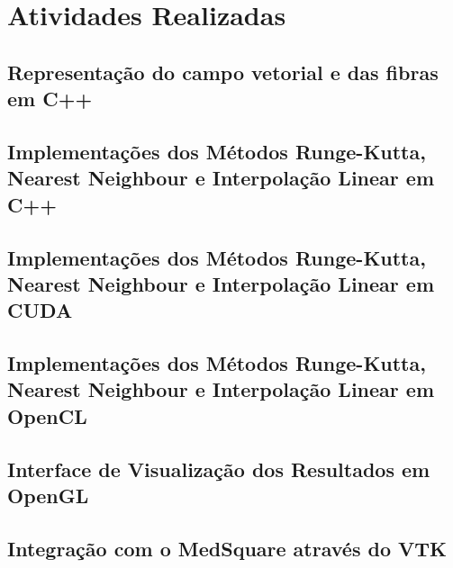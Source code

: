 \chapter{Atividades Realizadas}

\section{Representação do campo vetorial e das fibras em C++}
\section{Implementações dos Métodos Runge-Kutta, Nearest Neighbour e Interpolação Linear em C++}
\section{Implementações dos Métodos Runge-Kutta, Nearest Neighbour e Interpolação Linear em CUDA}
\section{Implementações dos Métodos Runge-Kutta, Nearest Neighbour e Interpolação Linear em OpenCL}
\section{Interface de Visualização dos Resultados em OpenGL}
\section{Integração com o MedSquare através do VTK}
